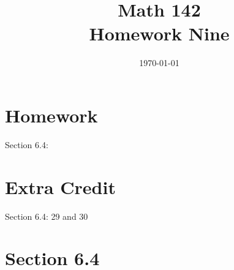 \documentclass{exam}
\author{}
\date{\today}
\title{Math 142 \\ Homework Nine}
\begin{document}
  \maketitle

  \section{Homework}
  Section 6.4: 

  \section{Extra Credit}
  Section 6.4: 29 and 30

  \ifprintanswers

    \section{Section 6.4}
\end{document}
